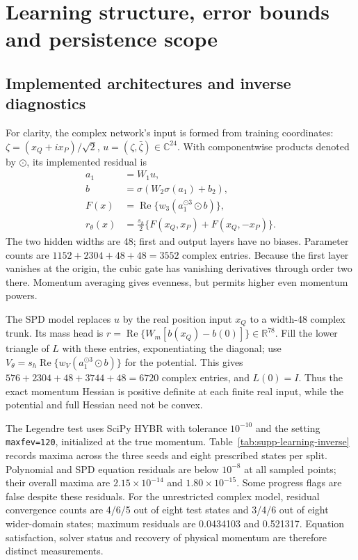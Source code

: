 \section{Learning structure, error bounds and persistence scope}
\label{supp:learning-kam}

\subsection{Implemented architectures and inverse diagnostics}
For clarity, the complex network's input is formed from training coordinates: $\zeta=(x_Q+ix_P)/\sqrt2$, $u=(\zeta,\bar\zeta)\in\mathbb C^{24}$. With componentwise products denoted by $\odot$, its implemented residual is
\begin{equation}
 \begin{aligned}
 a_1&=W_1u,\\
 b&=\sigma(W_2\sigma(a_1)+b_2),\\
 F(x)&=\operatorname{Re}\{w_3(a_1^{\odot3}\odot b)\},\\
 r_\theta(x)&=\tfrac{s_h}{2}\{F(x_Q,x_P)+F(x_Q,-x_P)\}.
 \end{aligned}
 \label{eq:supp-learn-network}
\end{equation}
The two hidden widths are 48; first and output layers have no biases. Parameter counts are $1152+2304+48+48=3552$ complex entries. Because the first layer vanishes at the origin, the cubic gate has vanishing derivatives through order two there. Momentum averaging gives evenness, but permits higher even momentum powers.

The SPD model replaces $u$ by the real position input $x_Q$ to a width-48 complex trunk. Its mass head is $r=\operatorname{Re}\{W_m[b(x_Q)-b(0)]\}\in\mathbb R^{78}$. Fill the lower triangle of $L$ with these entries, exponentiating the diagonal; use $V_\theta=s_h\operatorname{Re}\{w_V(a_1^{\odot3}\odot b)\}$ for the potential. This gives $576+2304+48+3744+48=6720$ complex entries, and $L(0)=I$. Thus the exact momentum Hessian is positive definite at each finite real input, while the potential and full Hessian need not be convex.

The Legendre test uses SciPy HYBR with tolerance $10^{-10}$ and the setting \texttt{maxfev=120}, initialized at the true momentum. Table~\ref{tab:supp-learning-inverse} records maxima across the three seeds and eight prescribed states per split. Polynomial and SPD equation residuals are below $10^{-8}$ at all sampled points; their overall maxima are $2.15\times10^{-14}$ and $1.80\times10^{-15}$. Some progress flags are false despite these residuals. For the unrestricted complex model, residual convergence counts are 4/6/5 out of eight test states and 3/4/6 out of eight wider-domain states; maximum residuals are 0.0434103 and 0.521317. Equation satisfaction, solver status and recovery of physical momentum are therefore distinct measurements.

